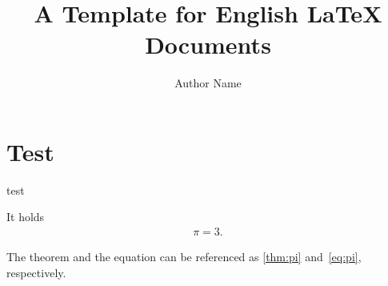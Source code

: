 \documentclass[a4paper, 11pt]{article}
\title{A Template for English LaTeX Documents}
\author{Author Name}
\begin{document}
\maketitle


\section{Test}
test

\begin{theorem} \label{thm:pi}
  It holds
  \begin{align} \label{eq:pi}
    \pi = 3.
  \end{align}
\end{theorem}

The theorem and the equation can be referenced as \cref{thm:pi} and~\eqref{eq:pi}, respectively.




\end{document}
